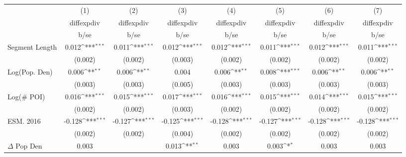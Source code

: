 {
\def\sym#1{\ifmmode^{#1}\else\(^{#1}\)\fi}
\begin{tabular}{l*{7}{c}}
\toprule
                    &\multicolumn{1}{c}{(1)}&\multicolumn{1}{c}{(2)}&\multicolumn{1}{c}{(3)}&\multicolumn{1}{c}{(4)}&\multicolumn{1}{c}{(5)}&\multicolumn{1}{c}{(6)}&\multicolumn{1}{c}{(7)}\\
                    &\multicolumn{1}{c}{diffexpdiv}&\multicolumn{1}{c}{diffexpdiv}&\multicolumn{1}{c}{diffexpdiv}&\multicolumn{1}{c}{diffexpdiv}&\multicolumn{1}{c}{diffexpdiv}&\multicolumn{1}{c}{diffexpdiv}&\multicolumn{1}{c}{diffexpdiv}\\
                    &        b/se         &        b/se         &        b/se         &        b/se         &        b/se         &        b/se         &        b/se         \\
\midrule
Segment Length      &       0.012\sym{***}&       0.011\sym{***}&       0.012\sym{***}&       0.012\sym{***}&       0.011\sym{***}&       0.012\sym{***}&       0.011\sym{***}\\
                    &     (0.002)         &     (0.002)         &     (0.003)         &     (0.002)         &     (0.002)         &     (0.002)         &     (0.002)         \\
Log(Pop. Den)       &       0.006\sym{**} &       0.006\sym{**} &       0.004         &       0.006\sym{**} &       0.008\sym{***}&       0.006\sym{**} &       0.006\sym{**} \\
                    &     (0.003)         &     (0.003)         &     (0.005)         &     (0.003)         &     (0.003)         &     (0.003)         &     (0.003)         \\
Log($\#$ POI)       &       0.016\sym{***}&       0.015\sym{***}&       0.017\sym{***}&       0.016\sym{***}&       0.015\sym{***}&       0.014\sym{***}&       0.015\sym{***}\\
                    &     (0.002)         &     (0.002)         &     (0.003)         &     (0.002)         &     (0.002)         &     (0.002)         &     (0.002)         \\
ESM. 2016           &      -0.128\sym{***}&      -0.127\sym{***}&      -0.125\sym{***}&      -0.128\sym{***}&      -0.127\sym{***}&      -0.128\sym{***}&      -0.128\sym{***}\\
                    &     (0.002)         &     (0.002)         &     (0.004)         &     (0.002)         &     (0.002)         &     (0.002)         &     (0.002)         \\
$\Delta$ Pop Den    &       0.003         &                     &       0.013\sym{**} &       0.003         &       0.003\sym{*}  &       0.003         &       0.003         \\

\end{tabular}}
